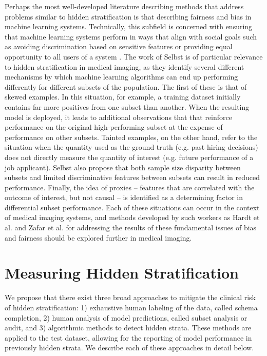 \documentclass{article}
\begin{document}
Perhaps the most well-developed literature describing methods that address problems similar to hidden stratification is that describing fairness and bias in machine learning systems. 
 Technically, this subfield is concerned with ensuring that machine learning systems perform in ways that align with social goals such as avoiding discrimination based on sensitive features or providing equal opportunity to all users of a system \citep{Barocas2017-ka}.  
 The work of Selbst \citep{Selbst2017-gz} is of particular relevance to hidden stratification in medical imaging, as they identify several different mechanisms by which machine learning algorithms can end up performing differently for different subsets of the population. 
  The first of these is that of skewed examples.  
  In this situation, for example, a training dataset initially contains far more positives from one subset than another.  
  When the resulting model is deployed, it leads to additional observations that that reinforce performance on the original high-performing subset at the expense of performance on other subsets. 
  Tainted examples, on the other hand, refer to the situation when the quantity used as the ground truth (e.g. past hiring decisions) does not directly measure the quantity of interest (e.g. future performance of a job applicant).  
  Selbst \citep{Selbst2017-gz} also propose that both sample size disparity between subsets and limited discriminative features between subsets can result in reduced performance. 
   Finally, the idea of proxies -- features that are correlated with the outcome of interest, but not causal -- is identified as a determining factor in differential subset performance. 
    Each of these situations can occur in the context of medical imaging systems, and methods developed by such workers as Hardt et al. \citep{Hardt2016-ac} and Zafar et al. \citep{Zafar2017-ec} for addressing the results of these fundamental issues of bias and fairness should be explored further in medical imaging.  

\section{Measuring Hidden Stratification}

We propose that there exist three broad approaches to mitigate the clinical risk of hidden stratification: 1) exhaustive human labeling of the data, called schema completion, 2) human analysis of model predictions, called subset analysis or audit, and 3) algorithmic methods to detect hidden strata. These methods are applied to the test dataset, allowing for the reporting of model performance in previously hidden strata.  We describe each of these approaches in detail below.  
\end{document}
